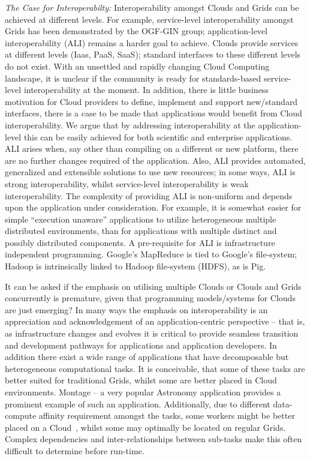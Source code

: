 \documentclass[conference,final]{IEEEtran}
\begin{document}
{\it The Case for Interoperabilty:} Interoperability amongst Clouds
and Grids can be achieved at different levels. For example,
service-level interoperability amongst Grids has been demonstrated by
the OGF-GIN group; application-level interoperability (ALI) remains a
harder goal to achieve.  Clouds provide services at different levels
(Iaas, PaaS, SaaS); standard interfaces to these different levels do
not exist.  With an unsettled and rapidly changing Cloud Computing
landscape, it is unclear if the community is ready for standards-based
service-level interoperability at the moment.  In addition, there is
little business motivation for Cloud providers to define, implement
and support new/standard interfaces, there is a case to be made that
applications would benefit from Cloud interoperability.  We argue that
by addressing interoperability at the application-level this can be
easily achieved for both scientific and enterprise
applications.  %
ALI arises when, say other than compiling on a different or new
platform, there are no further changes required of the
application. Also, ALI provides automated, generalized and extensible
solutions to use new resources; in some ways, ALI is strong
interoperability, whilst service-level interoperability is weak
interoperability.  The complexity of providing ALI is non-uniform and
depends upon the application under consideration. For example, it is
somewhat easier for simple ``execution unaware'' applications to
utilize heterogeneous multiple distributed environments, than for
applications with multiple distinct and possibly distributed
components. A pre-requisite for ALI is infrastructure independent
programming. Google's MapReduce is tied to Google's file-system;
Hadoop is intrinsically linked to Hadoop file-system (HDFS), as is
Pig.

It can be asked if the emphasis on utilising multiple Clouds or Clouds
and Grids concurrently is premature, given that programming
models/systems for Clouds are just emerging? In many ways the emphasis
on interoperability is an appreciation and acknowledgement of an
application-centric perspective -- that is, as infrastructure changes
and evolves it is critical to provide seamless transition and
development pathways for applications and application developers. In
addition there exist a wide range of applications that have
decomposable but heterogeneous computational tasks. It is conceivable,
that some of these tasks are better suited for traditional Grids,
whilst some are better placed in Cloud environments. Montage -- a very
popular Astronomy application provides a prominent example of such an
application.  Additionally, due to different data-compute affinity
requirement amongst the tasks, some workers might be better placed on
a Cloud~\cite{jha_ccpe09}, whilst some may optimally be located on
regular Grids.  Complex dependencies and inter-relationships between
sub-tasks make this often difficult to determine before run-time.
\end{document}
